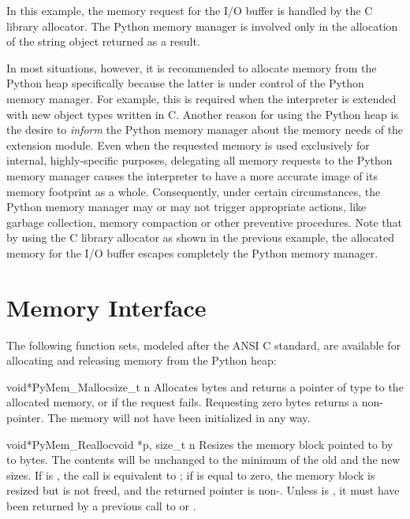 \documentclass{manual}
\begin{document}
In this example, the memory request for the I/O buffer is handled by
the C library allocator. The Python memory manager is involved only
in the allocation of the string object returned as a result.

In most situations, however, it is recommended to allocate memory from
the Python heap specifically because the latter is under control of
the Python memory manager. For example, this is required when the
interpreter is extended with new object types written in C. Another
reason for using the Python heap is the desire to \emph{inform} the
Python memory manager about the memory needs of the extension module.
Even when the requested memory is used exclusively for internal,
highly-specific purposes, delegating all memory requests to the Python
memory manager causes the interpreter to have a more accurate image of
its memory footprint as a whole. Consequently, under certain
circumstances, the Python memory manager may or may not trigger
appropriate actions, like garbage collection, memory compaction or
other preventive procedures. Note that by using the C library
allocator as shown in the previous example, the allocated memory for
the I/O buffer escapes completely the Python memory manager.


\section{Memory Interface \label{memoryInterface}}

The following function sets, modeled after the ANSI C standard, are
available for allocating and releasing memory from the Python heap:


\begin{cfuncdesc}{void*}{PyMem_Malloc}{size_t n}
Allocates  bytes and returns a pointer of type  to
the allocated memory, or \NULL{} if the request fails.  Requesting zero
bytes returns a non-\NULL{} pointer.
The memory will not have been initialized in any way.
\end{cfuncdesc}

\begin{cfuncdesc}{void*}{PyMem_Realloc}{void *p, size_t n}
Resizes the memory block pointed to by  to  bytes. The
contents will be unchanged to the minimum of the old and the new
sizes. If  is \NULL{}, the call is equivalent to
; if  is equal to zero, the
memory block is resized but is not freed, and the returned pointer is
non-\NULL{}.  Unless  is \NULL{}, it must have been returned by
a previous call to  or
.
\end{cfuncdesc}
\end{document}

